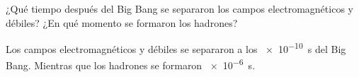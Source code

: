 \documentclass[./../main.tex]{subfiles}
\begin{document}
	\begin{exercise}
		¿Qué tiempo después del Big Bang se separaron los campos electromagnéticos y débiles? ¿En qué momento se formaron los hadrones?
		\begin{solution}
			Los campos electromagnéticos y débiles se separaron a los \qty{e-10}{\s} del Big Bang. Mientras que los hadrones se formaron \qty{e-6}{\s}.
		\end{solution}
	\end{exercise}
\end{document}
